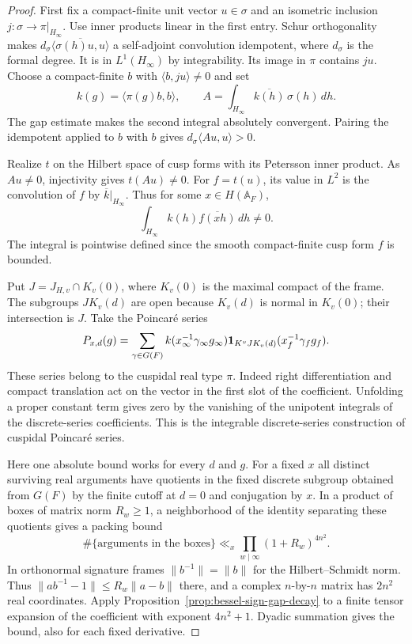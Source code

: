 \begin{proof}
First fix a compact-finite unit vector \(u\in\sigma\) and an isometric inclusion
\(j:\sigma\to\pi|_{H_\infty}\). Use inner products linear in the first
entry. Schur orthogonality makes
\(d_\sigma\overline{\langle\sigma(h)u,u\rangle}\) a self-adjoint
convolution idempotent, where \(d_\sigma\) is the formal degree.
It is in \(L^1(H_\infty)\) by integrability. Its image in \(\pi\)
contains \(ju\). Choose a compact-finite \(b\) with
\(\langle b,ju\rangle\ne0\) and set
\[
 k(g)=\langle\pi(g)b,b\rangle,\qquad
 A=\int_{H_\infty}\overline{k(h)}\,\sigma(h)\,dh .
\]
The gap estimate makes the second integral absolutely convergent.
Pairing the idempotent applied to \(b\) with \(b\) gives
\(d_\sigma\langle Au,u\rangle>0\).

Realize \(t\) on the Hilbert space of cusp forms with its Petersson
inner product. As \(Au\ne0\), injectivity gives \(t(Au)\ne0\).
For \(f=t(u)\), its value in \(L^2\) is the convolution of \(f\)
by \(\overline{k}|_{H_\infty}\). Thus for some \(x\in H(\mathbb A_F)\),
\[
                 \int_{H_\infty} k(h)\overline{f(xh)}\,dh\ne0 .
\]
The integral is pointwise defined since the smooth compact-finite cusp
form \(f\) is bounded.

Put \(J=J_{H,v}\cap K_v(0)\), where \(K_v(0)\) is the maximal compact
of the frame. The subgroups \(J K_v(d)\) are open because \(K_v(d)\)
is normal in \(K_v(0)\); their intersection is \(J\). Take the
Poincar\'e series
\[
 P_{x,d}(g)=\sum_{\gamma\in G(F)}
      k(x_\infty^{-1}\gamma_\infty g_\infty)
      {\bf1}_{K^v J K_v(d)}(x_f^{-1}\gamma_f g_f).
\]
These series belong to the cuspidal real type \(\pi\). Indeed right
differentiation and compact translation act on the vector in the first slot of
the coefficient. Unfolding a proper constant term gives zero by the
vanishing of the unipotent integrals of the discrete-series
coefficients. This is the integrable discrete-series construction
of cuspidal Poincar\'e series. \cite{muic-fourier-poincare}

Here one absolute bound works for every \(d\) and \(g\). For a fixed
\(x\) all distinct surviving real arguments have quotients in the
fixed discrete subgroup obtained from \(G(F)\) by the finite cutoff
at \(d=0\) and conjugation by \(x\). In a product of boxes of matrix
norm \(R_w\ge1\), a neighborhood of the identity separating these
quotients gives a packing bound
\[
           \#\{\text{arguments in the boxes}\}
                      \ll_x\prod_{w\mid\infty}(1+R_w)^{4n^2}.
\]
In orthonormal signature frames \(\|b^{-1}\|=\|b\|\) for the
Hilbert--Schmidt norm. Thus \(\|ab^{-1}-1\|\le R_w\|a-b\|\) there, and a complex
\(n\)-by-\(n\) matrix has \(2n^2\) real coordinates. Apply
Proposition~\ref{prop:bessel-sign-gap-decay} to a finite tensor
expansion of the coefficient with exponent \(4n^2+1\). Dyadic
summation gives the bound, also for each fixed derivative.


\end{proof}
